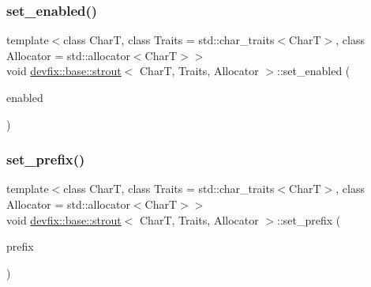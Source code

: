 \mbox{\label{structdevfix_1_1base_1_1strout_a49000248c873a593348082f151ccab9b}} 
\subsubsection{\texorpdfstring{set\+\_\+enabled()}{set\_enabled()}}
{\footnotesize\ttfamily template$<$class CharT, class Traits = std\+::char\+\_\+traits$<$\+Char\+T$>$, class Allocator = std\+::allocator$<$\+Char\+T$>$$>$ \\
void \hyperlink{structdevfix_1_1base_1_1strout}{devfix\+::base\+::strout}$<$ CharT, Traits, Allocator $>$\+::set\+\_\+enabled (\begin{DoxyParamCaption}\item[{bool}]{enabled }\end{DoxyParamCaption})\hspace{0.3cm}{\ttfamily [inline]}}

\mbox{\label{structdevfix_1_1base_1_1strout_ab32a1f2eb733dcba516e439f651f5910}} 
\subsubsection{\texorpdfstring{set\+\_\+prefix()}{set\_prefix()}}
{\footnotesize\ttfamily template$<$class CharT, class Traits = std\+::char\+\_\+traits$<$\+Char\+T$>$, class Allocator = std\+::allocator$<$\+Char\+T$>$$>$ \\
void \hyperlink{structdevfix_1_1base_1_1strout}{devfix\+::base\+::strout}$<$ CharT, Traits, Allocator $>$\+::set\+\_\+prefix (\begin{DoxyParamCaption}\item[{const std\+::basic\+\_\+string$<$ CharT $>$ \&}]{prefix }\end{DoxyParamCaption})\hspace{0.3cm}{\ttfamily [inline]}}

\mbox{\label{structdevfix_1_1base_1_1strout_a50b305dcf9905bfe75fa1bba42718169}} 
